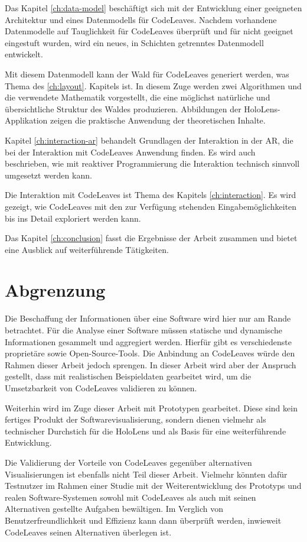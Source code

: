 Das Kapitel \ref{ch:data-model} beschäftigt sich mit der Entwicklung einer geeigneten Architektur und eines Datenmodells für CodeLeaves. Nachdem vorhandene Datenmodelle auf Tauglichkeit für CodeLeaves überprüft und für nicht geeignet eingestuft wurden, wird ein neues, in Schichten getrenntes Datenmodell entwickelt.

Mit diesem Datenmodell kann der Wald für CodeLeaves generiert werden, was Thema des \ref{ch:layout}. Kapitels ist. In diesem Zuge werden zwei Algorithmen und die verwendete Mathematik vorgestellt, die eine möglichst natürliche und übersichtliche Struktur des Waldes produzieren. Abbildungen der HoloLens-Applikation zeigen die praktische Anwendung der theoretischen Inhalte.

Kapitel \ref{ch:interaction-ar} behandelt Grundlagen der Interaktion in der AR, die bei der Interaktion mit CodeLeaves Anwendung finden. Es wird auch beschrieben, wie mit reaktiver Programmierung die Interaktion technisch sinnvoll umgesetzt werden kann.

Die Interaktion mit CodeLeaves ist Thema des Kapitels \ref{ch:interaction}. Es wird gezeigt, wie CodeLeaves mit den zur Verfügung stehenden Eingabemöglichkeiten bis ins Detail exploriert werden kann.

Das Kapitel \ref{ch:conclusion} fasst die Ergebnisse der Arbeit zusammen und bietet eine Ausblick auf weiterführende Tätigkeiten.

\section{Abgrenzung}
\label{sec:distinction}

Die Beschaffung der Informationen über eine Software wird hier nur am Rande betrachtet. Für die Analyse einer Software müssen statische und dynamische Informationen gesammelt und aggregiert werden. Hierfür gibt es verschiedenste proprietäre sowie Open-Source-Tools. Die Anbindung an CodeLeaves würde den Rahmen dieser Arbeit jedoch sprengen. In dieser Arbeit wird aber der Anspruch gestellt, dass mit realistischen Beispieldaten gearbeitet wird, um die Umsetzbarkeit von CodeLeaves validieren zu können.

Weiterhin wird im Zuge dieser Arbeit mit Prototypen gearbeitet. Diese sind kein fertiges Produkt der Softwarevisualisierung, sondern dienen vielmehr als technischer Durchstich für die HoloLens und als Basis für eine weiterführende Entwicklung.

Die Validierung der Vorteile von CodeLeaves gegenüber alternativen Visualisierungen ist ebenfalls nicht Teil dieser Arbeit. Vielmehr könnten dafür Testnutzer im Rahmen einer Studie mit der Weiterentwicklung des Prototyps und realen Software-Systemen sowohl mit CodeLeaves als auch mit seinen Alternativen gestellte Aufgaben bewältigen. Im Verglich von Benutzerfreundlichkeit und Effizienz kann dann überprüft werden, inwieweit CodeLeaves seinen Alternativen überlegen ist.

